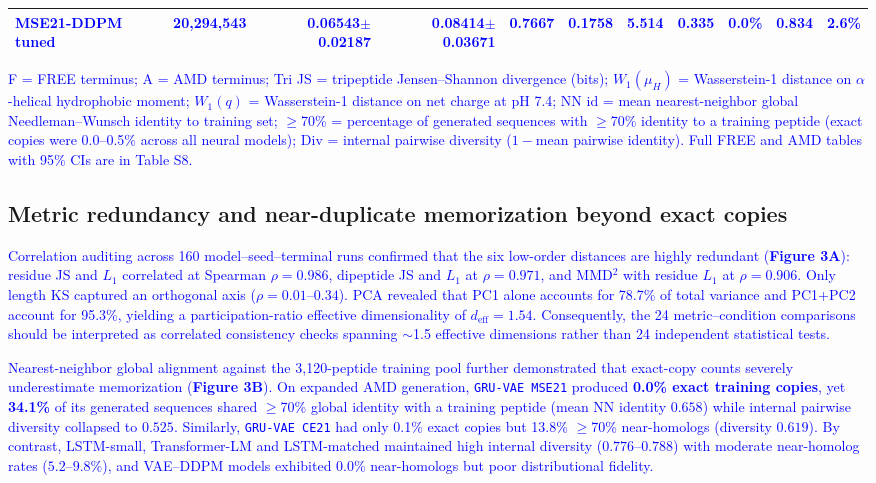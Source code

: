 \documentclass[unnumsec,webpdf,contemporary,large]{oup-authoring-template}
\newcommand{\rev}[1]{\textcolor{blue}{#1}}
\begin{document}
\begin{table}[t]
\begin{tabular}{lrrrrrrrrrr}
\rev{MSE21-DDPM tuned} & \rev{20,294,543} & \rev{0.06543$\pm$0.02187} & \rev{0.08414$\pm$0.03671} & \rev{0.7667} & \rev{0.1758} & \rev{5.514} & \rev{0.335} & \rev{0.0\%} & \rev{0.834} & \rev{2.6\%} \\
\bottomrule
\end{tabular}
\par\smallskip
\begin{minipage}{0.96\textwidth}\footnotesize
\rev{F = FREE terminus; A = AMD terminus; Tri JS = tripeptide Jensen--Shannon divergence (bits); $W_1(\mu_H)$ = Wasserstein-1 distance on $\alpha$-helical hydrophobic moment; $W_1(q)$ = Wasserstein-1 distance on net charge at pH 7.4; NN id = mean nearest-neighbor global Needleman--Wunsch identity to training set; $\geq$70\% = percentage of generated sequences with $\geq$70\% identity to a training peptide (exact copies were 0.0--0.5\% across all neural models); Div = internal pairwise diversity ($1-$mean pairwise identity). Full FREE and AMD tables with 95\% CIs are in Table S8.}
\end{minipage}
\end{table}

\subsection{Metric redundancy and near-duplicate memorization beyond exact copies}

\rev{Correlation auditing across 160 model--seed--terminal runs confirmed that the six low-order distances are highly redundant (\textbf{Figure 3A}): residue JS and $L_1$ correlated at Spearman $\rho=0.986$, dipeptide JS and $L_1$ at $\rho=0.971$, and MMD$^2$ with residue $L_1$ at $\rho=0.906$. Only length KS captured an orthogonal axis ($\rho=0.01\text{--}0.34$). PCA revealed that PC1 alone accounts for 78.7\% of total variance and PC1+PC2 account for 95.3\%, yielding a participation-ratio effective dimensionality of $d_{\mathrm{eff}}=1.54$. Consequently, the 24 metric--condition comparisons should be interpreted as correlated consistency checks spanning $\sim$1.5 effective dimensions rather than 24 independent statistical tests.}

\rev{Nearest-neighbor global alignment against the 3,120-peptide training pool further demonstrated that exact-copy counts severely underestimate memorization (\textbf{Figure 3B}). On expanded AMD generation, \texttt{GRU-VAE MSE21} produced \textbf{0.0\% exact training copies}, yet \textbf{34.1\%} of its generated sequences shared $\geq$70\% global identity with a training peptide (mean NN identity $0.658$) while internal pairwise diversity collapsed to $0.525$. Similarly, \texttt{GRU-VAE CE21} had only 0.1\% exact copies but 13.8\% $\geq$70\% near-homologs (diversity $0.619$). By contrast, LSTM-small, Transformer-LM and LSTM-matched maintained high internal diversity ($0.776\text{--}0.788$) with moderate near-homolog rates ($5.2\text{--}9.8\%$), and VAE--DDPM models exhibited 0.0\% near-homologs but poor distributional fidelity.}
\end{document}
